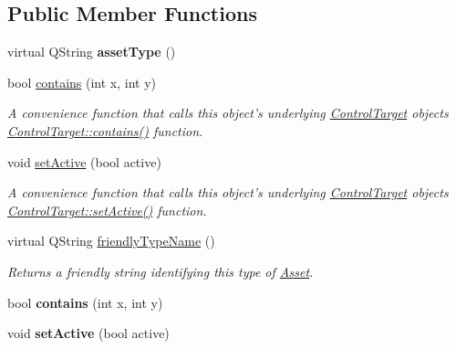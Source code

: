 \subsection*{Public Member Functions}
\begin{DoxyCompactItemize}
\item 
\hypertarget{class_picto_1_1_control_target_result_ad61cc6a7872a231a1f68440bb2d4a048}{virtual Q\-String {\bfseries asset\-Type} ()}\label{class_picto_1_1_control_target_result_ad61cc6a7872a231a1f68440bb2d4a048}

\item 
bool \hyperlink{class_picto_1_1_control_target_result_a34c979c9a23cb65809a282b98feb08af}{contains} (int x, int y)
\begin{DoxyCompactList}\small\item\em A convenience function that calls this object's underlying \hyperlink{class_picto_1_1_control_target}{Control\-Target} objects \hyperlink{class_picto_1_1_control_target_aeba5d02793b4d40933e793cde3971940}{Control\-Target\-::contains()} function. \end{DoxyCompactList}\item 
void \hyperlink{class_picto_1_1_control_target_result_a5475c36fb8c2e0436a2825f5662e19f7}{set\-Active} (bool active)
\begin{DoxyCompactList}\small\item\em A convenience function that calls this object's underlying \hyperlink{class_picto_1_1_control_target}{Control\-Target} objects \hyperlink{class_picto_1_1_control_target_a36c8b737d2014a5686d8aed7ffa1429f}{Control\-Target\-::set\-Active()} function. \end{DoxyCompactList}\item 
virtual Q\-String \hyperlink{class_picto_1_1_control_target_result_a4c44eb3cf2f923bf9e0cbf4164a50874}{friendly\-Type\-Name} ()
\begin{DoxyCompactList}\small\item\em Returns a friendly string identifying this type of \hyperlink{class_picto_1_1_asset}{Asset}. \end{DoxyCompactList}\item 
\hypertarget{class_picto_1_1_control_target_result_a34c979c9a23cb65809a282b98feb08af}{bool {\bfseries contains} (int x, int y)}\label{class_picto_1_1_control_target_result_a34c979c9a23cb65809a282b98feb08af}

\item 
\hypertarget{class_picto_1_1_control_target_result_a5475c36fb8c2e0436a2825f5662e19f7}{void {\bfseries set\-Active} (bool active)}\label{class_picto_1_1_control_target_result_a5475c36fb8c2e0436a2825f5662e19f7}

\end{DoxyCompactItemize}
